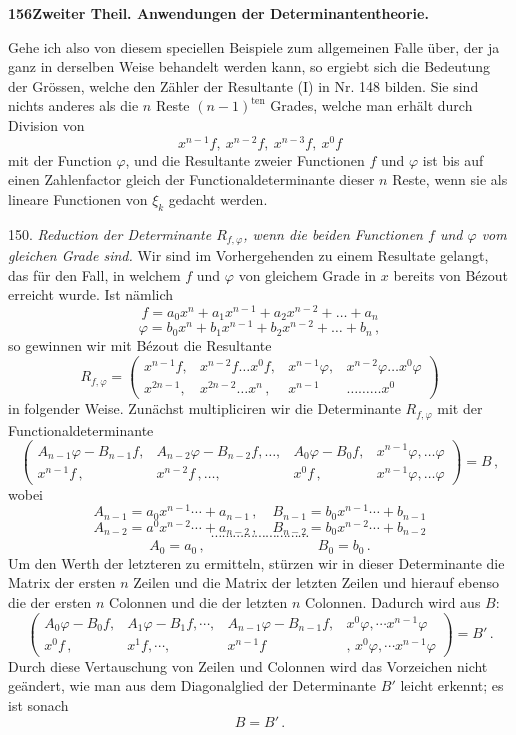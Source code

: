 \textbf{156\quad Zweiter Theil. Anwendungen der Determinantentheorie.}

Gehe ich also von diesem speciellen Beispiele zum allgemeinen Falle über, der ja ganz in derselben Weise behandelt werden kann, so ergiebt sich die Bedeutung der Grössen, welche den Zähler der Resultante (I) in Nr. 148 bilden. Sie sind nichts anderes als die $n$ Reste $(n-1)^{\text{ten}}$ Grades, welche man erhält durch Division von
\[ x^{n-1}f,\ x^{n-2}f,\ x^{n-3}f,\ x^0f \]
mit der Function $\varphi$, und die Resultante zweier Functionen $f$ und $\varphi$ ist bis auf einen Zahlenfactor gleich der Functionaldeterminante dieser $n$ Reste, wenn sie als lineare Functionen von $\xi_k$ gedacht werden.

150. \textit{Reduction der Determinante $R_{f,\varphi}$, wenn die beiden Functionen $f$ und $\varphi$ vom gleichen Grade sind.} Wir sind im Vorhergehenden zu einem Resultate gelangt, das für den Fall, in welchem $f$ und $\varphi$ von gleichem Grade in $x$ bereits von Bézout erreicht wurde. Ist nämlich
\[ f = a_0x^n + a_1x^{n-1} + a_2x^{n-2} + \ldots + a_n \]
\[ \varphi = b_0x^n + b_1x^{n-1} + b_2x^{n-2} + \ldots + b_n\,, \]
so gewinnen wir mit Bézout die Resultante
\[ R_{f,\varphi} = \begin{pmatrix} x^{n-1}f, & x^{n-2}f\ldots x^0f, & x^{n-1}\varphi, & x^{n-2}\varphi\ldots x^0\varphi\\ x^{2n-1}, & x^{2n-2}\ldots x^n\,, & x^{n-1} & \ldots\ldots\ldots x^0 \end{pmatrix} \]
in folgender Weise. Zunächst multipliciren wir die Determinante $R_{f,\varphi}$ mit der Functionaldeterminante
\[ \begin{pmatrix} A_{n-1}\varphi-B_{n-1}f, & A_{n-2}\varphi-B_{n-2}f,\ldots, & A_0\varphi-B_0f, & x^{n-1}\varphi,\ldots\varphi\\ x^{n-1}f\,, & x^{n-2}f\,,\ldots, & x^0f\,, & x^{n-1}\varphi,\ldots\varphi \end{pmatrix} = B\,, \]
wobei
\[ A_{n-1} = a_0x^{n-1}\cdots+a_{n-1}\,,\quad B_{n-1}=b_0x^{n-1}\cdots+b_{n-1} \]
\[ A_{n-2} = a^0x^{n-2}\cdots+a_{n-2}\,,\quad B_{n-2}=b_0x^{n-2}\cdots+b_{n-2} \] %
\[ \cdots\cdots\cdots\cdots\cdots\cdots\cdots\cdots\cdots \]
\[ A_0 = a_0\,,\qquad\qquad\qquad\qquad B_0=b_0\,. \]
Um den Werth der letzteren zu ermitteln, stürzen wir in dieser Determinante die Matrix der ersten $n$ Zeilen und die Matrix der letzten Zeilen und hierauf ebenso die der ersten $n$ Colonnen und die der letzten $n$ Colonnen. Dadurch wird aus $B$:
\[ \begin{pmatrix} A_0\varphi-B_0f, & A_1\varphi-B_1f,\cdots, & A_{n-1}\varphi-B_{n-1}f, & x^0\varphi,\cdots x^{n-1}\varphi\\ x^0f\,, & x^1f,\cdots, & x^{n-1}f & ,\,x^0\varphi,\cdots x^{n-1}\varphi \end{pmatrix} = B'\,. \]
Durch diese Vertauschung von Zeilen und Colonnen wird das Vorzeichen nicht geändert, wie man aus dem Diagonalglied der Determinante $B'$ leicht erkennt; es ist sonach
\[ B = B'\,. \]


